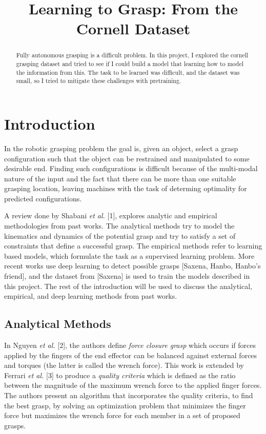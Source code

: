 \documentclass{article}
\title{Learning to Grasp: From the Cornell Dataset}
\begin{document}
\maketitle

\begin{abstract}
Fully autonomous grasping is a difficult problem. In this project, I explored
the cornell grasping dataset and tried to see if I could build a model that
learning how to model the information from this. The task to be learned was
difficult, and the dataset was small, so I tried to mitigate these challenges
with pretraining.
\end{abstract}

\section{Introduction}
In the robotic grasping problem the goal is, given an object, select a grasp
configuration such that the object can be restrained and
manipulated to some desirable end. Finding such configurations is difficult
because of the multi-modal nature of the input and the fact that there can be
more than one suitable grasping location, leaving machines with the task
of determing optimality for predicted configurations.

A review done by Shabani \textit{et al.} [1], explores analytic and empirical
methodologies from past works. The analytical
methods try to model the kinematics and dynamics of the potential grasp and try to
satisfy a set of constraints that define a successful grasp.
The empirical methods refer to learning based models, which formulate the
task as a
supervised learning problem. More recent works use deep learning to detect
possible grasps [Saxena, Hanbo, Hanbo's friend], and the dataset from [Saxena]
is used to train the models described in this project. The rest of the
introduction will be used to discuss the analytical, empirical, and deep learning
methods from past works.

\subsection{Analytical Methods}
In Nguyen \textit{et al.} [2], the authors define \textit{force closure
grasp} which occurs if forces applied by the fingers of the end
effector can be balanced against external forces and torques
(the latter is called the wrench force). This work is extended by Ferrari
\textit{et al.} [3] to produce a \textit{quality criteria} which is defined as
the ratio between the magnitude of the maximum wrench force to the
applied finger forces. The authors present an algorithm that incorporates the
quality criteria, to find the best grasp, by solving an optimization problem
that minimizes the finger force but maximizes the wrench force for each member
in a set of proposed grasps.
\end{document}
